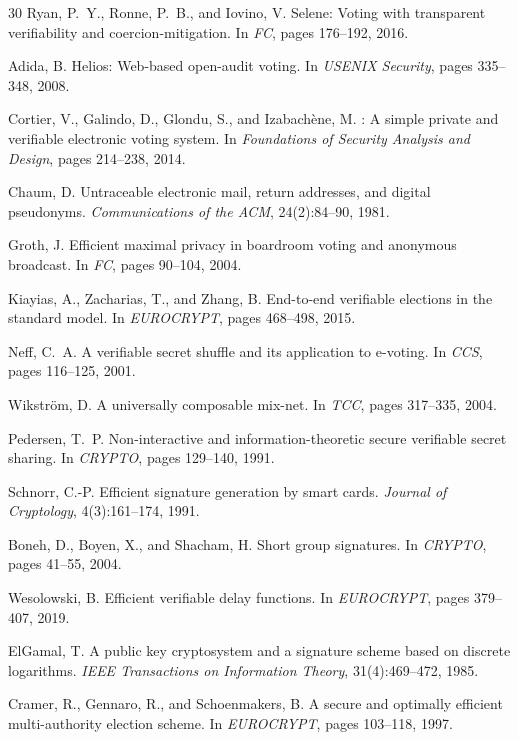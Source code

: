 \documentclass[11pt,a4paper]{article}
\begin{document}
\begin{thebibliography}{30}
Ryan, P.~Y., Ronne, P.~B., and Iovino, V.
\newblock Selene: Voting with transparent verifiability and coercion-mitigation.
\newblock In \emph{FC}, pages 176--192, 2016.

Adida, B.
\newblock Helios: Web-based open-audit voting.
\newblock In \emph{USENIX Security}, pages 335--348, 2008.

Cortier, V., Galindo, D., Glondu, S., and Izabach\`ene, M.
: A simple private and verifiable electronic voting system.
\newblock In \emph{Foundations of Security Analysis and Design}, pages 214--238, 2014.

Chaum, D.
\newblock Untraceable electronic mail, return addresses, and digital pseudonyms.
\newblock \emph{Communications of the ACM}, 24(2):84--90, 1981.

Groth, J.
\newblock Efficient maximal privacy in boardroom voting and anonymous broadcast.
\newblock In \emph{FC}, pages 90--104, 2004.

Kiayias, A., Zacharias, T., and Zhang, B.
\newblock End-to-end verifiable elections in the standard model.
\newblock In \emph{EUROCRYPT}, pages 468--498, 2015.

Neff, C.~A.
\newblock A verifiable secret shuffle and its application to e-voting.
\newblock In \emph{CCS}, pages 116--125, 2001.

Wikstr\"om, D.
\newblock A universally composable mix-net.
\newblock In \emph{TCC}, pages 317--335, 2004.

Pedersen, T.~P.
\newblock Non-interactive and information-theoretic secure verifiable secret sharing.
\newblock In \emph{CRYPTO}, pages 129--140, 1991.

Schnorr, C.-P.
\newblock Efficient signature generation by smart cards.
\newblock \emph{Journal of Cryptology}, 4(3):161--174, 1991.

Boneh, D., Boyen, X., and Shacham, H.
\newblock Short group signatures.
\newblock In \emph{CRYPTO}, pages 41--55, 2004.

Wesolowski, B.
\newblock Efficient verifiable delay functions.
\newblock In \emph{EUROCRYPT}, pages 379--407, 2019.

ElGamal, T.
\newblock A public key cryptosystem and a signature scheme based on discrete logarithms.
\newblock \emph{IEEE Transactions on Information Theory}, 31(4):469--472, 1985.

Cramer, R., Gennaro, R., and Schoenmakers, B.
\newblock A secure and optimally efficient multi-authority election scheme.
\newblock In \emph{EUROCRYPT}, pages 103--118, 1997.

\end{thebibliography}
\end{document}
